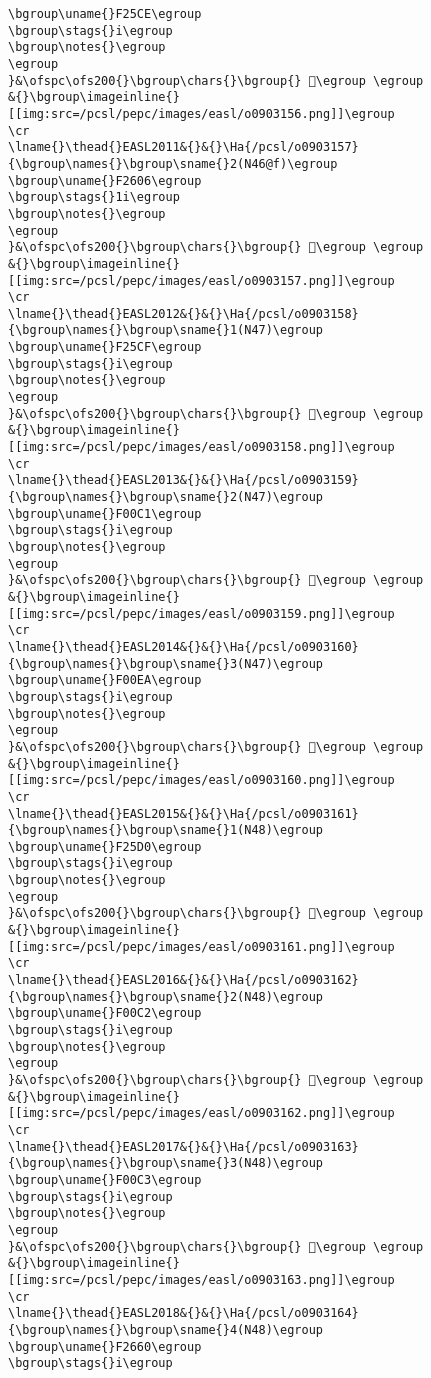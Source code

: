 \begin{verbatim}
\bgroup\uname{}F25CE\egroup
\bgroup\stags{}i\egroup
\bgroup\notes{}\egroup
\egroup
}&\ofspc\ofs200{}\bgroup\chars{}\bgroup{} 󲗎\egroup \egroup
&{}\bgroup\imageinline{}[[img:src=/pcsl/pepc/images/easl/o0903156.png]]\egroup
\cr
\lname{}\thead{}EASL2011&{}&{}\Ha{/pcsl/o0903157}{\bgroup\names{}\bgroup\sname{}2(N46@f)\egroup
\bgroup\uname{}F2606\egroup
\bgroup\stags{}1i\egroup
\bgroup\notes{}\egroup
\egroup
}&\ofspc\ofs200{}\bgroup\chars{}\bgroup{} 󲘆\egroup \egroup
&{}\bgroup\imageinline{}[[img:src=/pcsl/pepc/images/easl/o0903157.png]]\egroup
\cr
\lname{}\thead{}EASL2012&{}&{}\Ha{/pcsl/o0903158}{\bgroup\names{}\bgroup\sname{}1(N47)\egroup
\bgroup\uname{}F25CF\egroup
\bgroup\stags{}i\egroup
\bgroup\notes{}\egroup
\egroup
}&\ofspc\ofs200{}\bgroup\chars{}\bgroup{} 󲗏\egroup \egroup
&{}\bgroup\imageinline{}[[img:src=/pcsl/pepc/images/easl/o0903158.png]]\egroup
\cr
\lname{}\thead{}EASL2013&{}&{}\Ha{/pcsl/o0903159}{\bgroup\names{}\bgroup\sname{}2(N47)\egroup
\bgroup\uname{}F00C1\egroup
\bgroup\stags{}i\egroup
\bgroup\notes{}\egroup
\egroup
}&\ofspc\ofs200{}\bgroup\chars{}\bgroup{} 󰃁\egroup \egroup
&{}\bgroup\imageinline{}[[img:src=/pcsl/pepc/images/easl/o0903159.png]]\egroup
\cr
\lname{}\thead{}EASL2014&{}&{}\Ha{/pcsl/o0903160}{\bgroup\names{}\bgroup\sname{}3(N47)\egroup
\bgroup\uname{}F00EA\egroup
\bgroup\stags{}i\egroup
\bgroup\notes{}\egroup
\egroup
}&\ofspc\ofs200{}\bgroup\chars{}\bgroup{} 󰃪\egroup \egroup
&{}\bgroup\imageinline{}[[img:src=/pcsl/pepc/images/easl/o0903160.png]]\egroup
\cr
\lname{}\thead{}EASL2015&{}&{}\Ha{/pcsl/o0903161}{\bgroup\names{}\bgroup\sname{}1(N48)\egroup
\bgroup\uname{}F25D0\egroup
\bgroup\stags{}i\egroup
\bgroup\notes{}\egroup
\egroup
}&\ofspc\ofs200{}\bgroup\chars{}\bgroup{} 󲗐\egroup \egroup
&{}\bgroup\imageinline{}[[img:src=/pcsl/pepc/images/easl/o0903161.png]]\egroup
\cr
\lname{}\thead{}EASL2016&{}&{}\Ha{/pcsl/o0903162}{\bgroup\names{}\bgroup\sname{}2(N48)\egroup
\bgroup\uname{}F00C2\egroup
\bgroup\stags{}i\egroup
\bgroup\notes{}\egroup
\egroup
}&\ofspc\ofs200{}\bgroup\chars{}\bgroup{} 󰃂\egroup \egroup
&{}\bgroup\imageinline{}[[img:src=/pcsl/pepc/images/easl/o0903162.png]]\egroup
\cr
\lname{}\thead{}EASL2017&{}&{}\Ha{/pcsl/o0903163}{\bgroup\names{}\bgroup\sname{}3(N48)\egroup
\bgroup\uname{}F00C3\egroup
\bgroup\stags{}i\egroup
\bgroup\notes{}\egroup
\egroup
}&\ofspc\ofs200{}\bgroup\chars{}\bgroup{} 󰃃\egroup \egroup
&{}\bgroup\imageinline{}[[img:src=/pcsl/pepc/images/easl/o0903163.png]]\egroup
\cr
\lname{}\thead{}EASL2018&{}&{}\Ha{/pcsl/o0903164}{\bgroup\names{}\bgroup\sname{}4(N48)\egroup
\bgroup\uname{}F2660\egroup
\bgroup\stags{}i\egroup

\end{verbatim}
